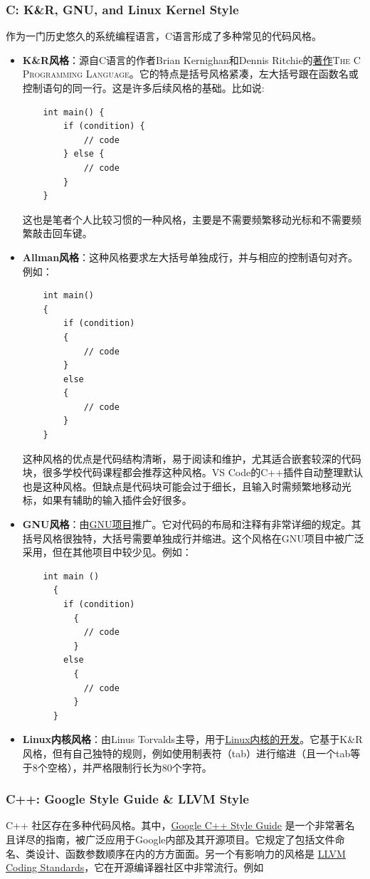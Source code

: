 \subsubsection{C: K\&R, GNU, and Linux Kernel Style}
作为一门历史悠久的系统编程语言，C语言形成了多种常见的代码风格。
\begin{itemize}
  \item \textbf{K\&R风格}：源自C语言的作者Brian Kernighan和Dennis Ritchie的\href{https://en.wikipedia.org/wiki/The_C_Programming_Language}{著作}\textsc{The C Programming Language}。它的特点是括号风格紧凑，左大括号跟在函数名或控制语句的同一行。这是许多后续风格的基础。比如说:
\begin{verbatim}
    int main() {
        if (condition) {
            // code
        } else {
            // code
        }
    }
\end{verbatim}
    这也是笔者个人比较习惯的一种风格，主要是不需要频繁移动光标和不需要频繁敲击回车键。
  \item \textbf{Allman风格}：这种风格要求左大括号单独成行，并与相应的控制语句对齐。例如：
\begin{verbatim}
    int main()
    {
        if (condition)
        {
            // code
        }
        else
        {
            // code
        }
    }
\end{verbatim}
    这种风格的优点是代码结构清晰，易于阅读和维护，尤其适合嵌套较深的代码块，很多学校代码课程都会推荐这种风格。VS Code的C++插件自动整理默认也是这种风格。但缺点是代码块可能会过于细长，且输入时需频繁地移动光标，如果有辅助的输入插件会好很多。
  \item \textbf{GNU风格}：由\href{https://www.gnu.org/prep/standards/standards.html}{GNU项目}推广。它对代码的布局和注释有非常详细的规定。其括号风格很独特，大括号需要单独成行并缩进。这个风格在GNU项目中被广泛采用，但在其他项目中较少见。例如：
\begin{verbatim}
    int main ()
      {
        if (condition)
          {
            // code
          }
        else
          {
            // code
          }
      }
\end{verbatim}
  \item \textbf{Linux内核风格}：由Linus Torvalds主导，用于\href{https://www.kernel.org/doc/html/latest/process/coding-style.html}{Linux内核的开发}。它基于K\&R风格，但有自己独特的规则，例如使用制表符（tab）进行缩进（且一个tab等于8个空格），并严格限制行长为80个字符。
\end{itemize}

\subsubsection{C++: Google Style Guide \& LLVM Style}
C++ 社区存在多种代码风格。其中，\href{https://google.github.io/styleguide/cppguide.html}{Google C++ Style Guide} 是一个非常著名且详尽的指南，被广泛应用于Google内部及其开源项目。它规定了包括文件命名、类设计、函数参数顺序在内的方方面面。另一个有影响力的风格是 \href{https://llvm.org/docs/CodingStandards.html}{LLVM Coding Standards}，它在开源编译器社区中非常流行。例如

